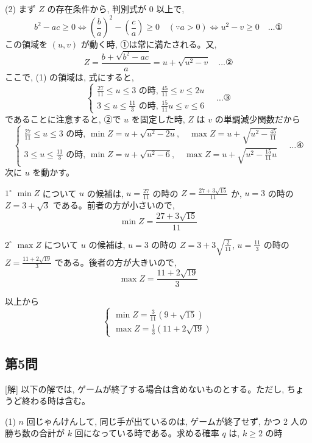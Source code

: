 \documentclass[../main.tex]{subfiles}
\begin{document}
(2) まず $Z$ の存在条件から, 判別式が 0 以上で,
\[
  b^2 - ac \ge 0 \iff \left(\frac{b}{a}\right)^2 - \left(\frac{c}{a}\right) \ge 0 \quad (\because a > 0) \iff u^2 - v \ge 0 \quad \dots \text{①}
\]
この領域を $(u, v)$ が動く時, ①は常に満たされる。又,
\[
  Z = \frac{b + \sqrt{b^2 - ac}}{a} = u + \sqrt{u^2 - v} \quad \dots \text{②}
\]
ここで, (1) の領域は, 式にすると,
\[
  \begin{cases}
    \frac{27}{11} \le u \le 3 \text{ の時, } \frac{45}{11} \le v \le 2u \\
    3 \le u \le \frac{11}{3} \text{ の時, } \frac{15}{11}u \le v \le 6
  \end{cases} \quad \dots \text{③}
\]
であることに注意すると, ②で $u$ を固定した時, $Z$ は $v$ の単調減少関数だから
\[
  \begin{cases}
    \frac{27}{11} \le u \le 3 \text{ の時, } \min Z = u + \sqrt{u^2 - 2u}, \quad \max Z = u + \sqrt{u^2 - \frac{45}{11}} \\
    3 \le u \le \frac{11}{3} \text{ の時, } \min Z = u + \sqrt{u^2 - 6}, \quad \max Z = u + \sqrt{u^2 - \frac{15}{11}u}
  \end{cases} \quad \dots \text{④}
\]
次に $u$ を動かす。

$1^\circ$ $\min Z$ について
$u$ の候補は, $u = \frac{27}{11}$ の時の $Z = \frac{27+3\sqrt{15}}{11}$ か, $u = 3$ の時の $Z = 3+\sqrt{3}$ である。前者の方が小さいので,
\[
  \min Z = \frac{27+3\sqrt{15}}{11}
\]

$2^\circ$ $\max Z$ について
$u$ の候補は, $u = 3$ の時の $Z = 3+3\sqrt{\frac{2}{11}}$, $u = \frac{11}{3}$ の時の $Z = \frac{11+2\sqrt{19}}{3}$ である。後者の方が大きいので,
\[
  \max Z = \frac{11+2\sqrt{19}}{3}
\]

以上から
\[
  \begin{cases}
    \min Z = \frac{3}{11}(9 + \sqrt{15}) \\
    \max Z = \frac{1}{3}(11 + 2\sqrt{19})
  \end{cases}
\]

\subsection*{第5問}

[解] 以下の解では, ゲームが終了する場合は含めないものとする。ただし, ちょうど終わる時は含む。

(1) $n$ 回じゃんけんして, 同じ手が出ているのは, ゲームが終了せず, かつ 2 人の勝ち数の合計が $k$ 回になっている時である。求める確率 $q$ は, $k \ge 2$ の時
\end{document}
